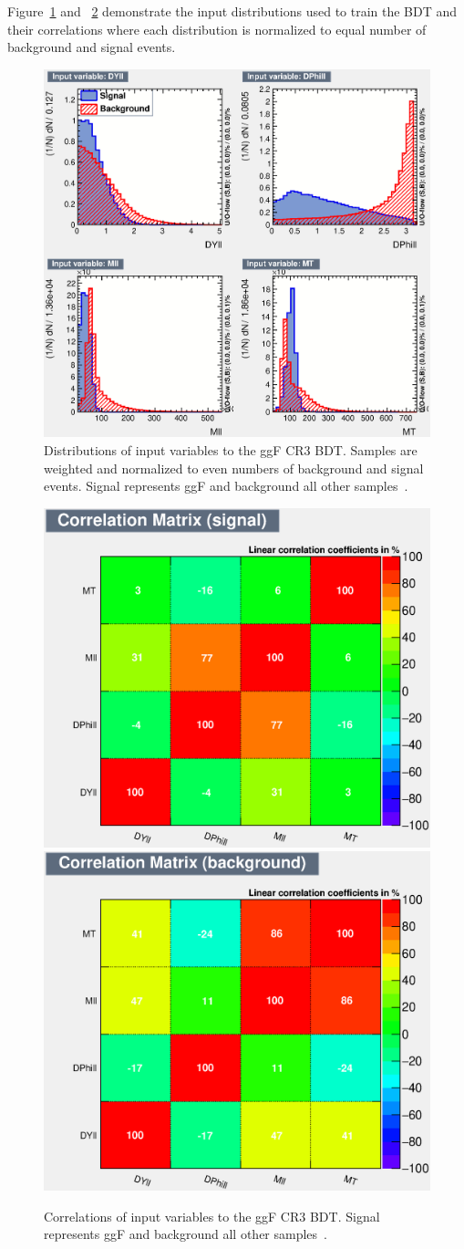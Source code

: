 Figure~\ref{fig:ggFCR3BDTinput} and ~\ref{fig:ggFCR3corrSB} demonstrate the input distributions used to train the BDT and their correlations where each distribution is normalized to equal number of background and signal events. 

\begin{figure}[!htbp]
    \centering
    \includegraphics[width=0.7\linewidth]{Pictures/ggFCR3/variables_id_c1.eps}
    \caption{Distributions of input variables to the ggF CR3 BDT. Samples are weighted and normalized to even numbers of background and signal events. Signal represents ggF and background all other samples~\cite{ourSupportNote}.}
    \label{fig:ggFCR3BDTinput}
\end{figure}
\begin{figure}[!htbp]
\centering
  \includegraphics[width=.45\linewidth]{Pictures/ggFCR3/CorrelationMatrixS.eps}
  \includegraphics[width=.45\linewidth]{Pictures/ggFCR3/CorrelationMatrixB.eps}
\caption{Correlations of input variables to the ggF CR3 BDT. Signal represents ggF and background all other samples~\cite{ourSupportNote}.}
\label{fig:ggFCR3corrSB}
\end{figure}

